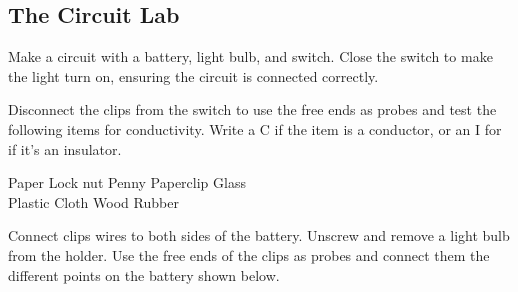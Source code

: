 \documentclass[]{exam}
\begin{document}
\clearpage

\subsection*{The Circuit Lab}

\begin{questions}
\question \label{Q1}
Make a circuit with a battery, light bulb, and switch. Close the switch to make the light turn on, ensuring the circuit is connected correctly. 

\question
Disconnect the clips from the switch to use the free ends as probes and test the following items for conductivity. Write a C if the item is a conductor, or an I for if it's an insulator.

\begin{center}
    Paper \fillin[I][2em] \hspace{2em}
    Lock nut \fillin[C][2em] \hspace{2em}
    Penny \fillin[C][2em] \hspace{2em}
    Paperclip \fillin[C][2em] \hspace{2em}
    Glass \fillin[I][2em] \hspace{2em} \\[1ex]
    Plastic \fillin[I][2em] \hspace{2em}
    Cloth \fillin[I][2em] \hspace{2em}
    Wood \fillin[I][2em] \hspace{2em}
    Rubber \fillin[I][2em] \hspace{2em}
\end{center}


\question
Connect clips wires to both sides of the battery. Unscrew and remove a light bulb from the holder. Use the free ends of the clips as probes and connect them the different points on the battery shown below.


\end{questions}
\end{document}
